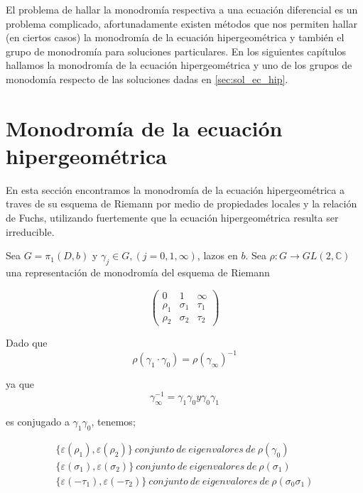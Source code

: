 El problema de hallar la monodrom\'ia respectiva a una ecuaci\'on diferencial es un problema complicado, afortunadamente existen m\'etodos que nos permiten hallar (en ciertos casos) la monodrom\'ia de la ecuaci\'on hipergeom\'etrica y tambi\'en el grupo de monodrom\'ia para soluciones particulares. En los siguientes cap\'itulos hallamos la monodrom\'ia de la ecuaci\'on hipergeom\'etrica y uno de los grupos de monodom\'ia respecto de las soluciones dadas en \ref{sec:sol_ec_hip}.


\section{Monodrom\'ia de la ecuaci\'on hipergeom\'etrica}

En esta secci\'on encontramos la monodrom\'ia de la ecuaci\'on hipergeom\'etrica a traves de su esquema de Riemann por medio de propiedades locales y la relaci\'on de Fuchs, utilizando fuertemente que la ecuaci\'on hipergeom\'etrica resulta ser irreducible.

Sea $G=\pi_{1} (D,b) $ y $\gamma_{j} \in G, (j=0,1,\infty )$, lazos en $b$. Sea $\rho: G \rightarrow GL(2,\mathbb{C}) $ una representaci\'on de monodrom\'ia del esquema de Riemann

\[ \left( \begin{array}{ccc}
0 & 1 & \infty \\
\rho_{1} & \sigma_{1} & \tau_{1} \\
\rho_{2} &\sigma_{2} & \tau_{2}  \end{array} \right)\]


Dado que 
\begin{equation}
\rho (\gamma_{1} \cdot \gamma_{0}) = \rho(\gamma_{\infty})^{-1}
\end{equation}

 ya que 
 \begin{equation}
 \gamma_{\infty}^{-1}=\gamma_{1} \gamma_{0}  y \gamma_{0}\gamma_{1}        
 \end{equation}
 
 
 es conjugado a $\gamma_{1} \gamma_{0}$, tenemos;

\begin{eqnarray} %
 \label{eqnarray:ecuacion1} \lbrace \varepsilon (\rho_{1}), \varepsilon (\rho_{2}) \rbrace \ conjunto \ de \ eigenvalores \ de \ \rho (\gamma_{0}) \\
 \lbrace \varepsilon (\sigma_{1}), \varepsilon (\sigma_{2}) \rbrace \  conjunto \ de \ eigenvalores \ de \ \rho (\sigma_{1}) \\
\lbrace \varepsilon(-\tau_{1}), \varepsilon (-\tau_{2}) \rbrace \  conjunto \ de \ eigenvalores \ de \ \rho (\sigma_{0} \sigma_{1})
\end{eqnarray}

